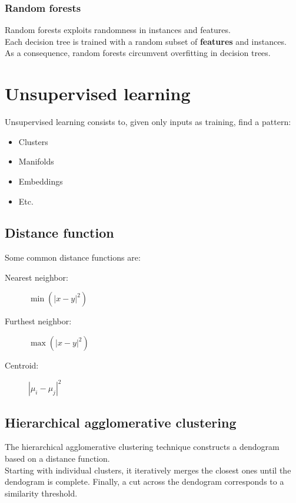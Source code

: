 \documentclass[11pt]{article}
\begin{document}
\subsubsection{Random forests}
\label{sec:orgbdb65db}
Random forests exploits randomness in instances and features. \\
Each decision tree is trained with a random subset of \textbf{features} and instances. \\
As a consequence, random forests circumvent overfitting in decision trees.
\newpage
\section{Unsupervised learning}
\label{sec:org0aa9c46}
Unsupervised learning consists to, given only inputs as training, find a pattern:
\begin{itemize}[itemsep=0pt]
\item Clusters
\item Manifolds
\item Embeddings
\item Etc.
\end{itemize}
\subsection{Distance function}
\label{sec:org1430999}
Some common distance functions are:
\begin{description}
\item[{Nearest neighbor:}] \(\min({|x - y|}^2)\)
\item[{Furthest neighbor:}] \(\max({|x - y|}^2)\)
\item[{Centroid:}] \({|\mu_i - \mu_j|}^2\)
\end{description}
\subsection{Hierarchical agglomerative clustering}
\label{sec:orgf150e34}
The hierarchical agglomerative clustering technique constructs a dendogram based on a
distance function. \\
Starting with individual clusters, it iteratively merges the closest ones until the
dendogram is complete. Finally, a cut across the dendogram corresponds to a similarity
threshold.
\end{document}
